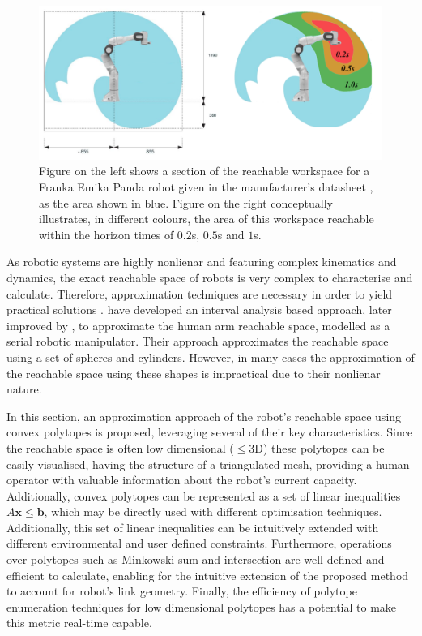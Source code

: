 \begin{figure}
    \centering
    \includegraphics[width=0.8\linewidth]{Papers/images/all_rs_thesis.png}
    \caption{Figure on the left shows a section of the reachable workspace for a Franka Emika Panda robot given in the manufacturer's datasheet \cite{franka_maual}, as the area shown in blue. Figure on the right conceptually illustrates, in different colours, the area of this workspace reachable within the horizon times of $0.2$s, $0.5$s and $1$s.}
    \label{fig:franak_reachable_worksapce}
\end{figure}

As robotic systems are highly nonlienar and featuring complex kinematics and dynamics, the exact reachable space of robots is very complex to characterise and calculate.  Therefore, approximation techniques are necessary in order to yield practical solutions \cite{Althoff2021SetBased}. \citet{pereira2017} have developed an interval analysis based approach, later improved by \citet{schepp2022}, to approximate the human arm reachable space, modelled as a serial robotic manipulator. Their approach approximates the reachable space using a set of spheres and cylinders. However, in many cases the approximation of the reachable space using these shapes is impractical due to their nonlienar nature. 

In this section, an approximation approach of the robot's reachable space using convex polytopes is proposed, leveraging several of their key characteristics. Since the reachable space is often low dimensional ($\leq$3D) these polytopes can be easily visualised, having the structure of a triangulated mesh, providing a human operator with valuable information about the robot's current capacity. Additionally, convex polytopes can be represented as a set of linear inequalities $A\bm{x}\leq\bm{b}$, which may be directly used with different optimisation techniques. Additionally, this set of linear inequalities can be intuitively extended with different environmental and user defined constraints. Furthermore, operations over polytopes such as Minkowski sum and intersection are well defined and efficient to calculate, enabling for the intuitive extension of the proposed method to account for robot's link geometry. Finally, the efficiency of polytope enumeration techniques for low dimensional polytopes has a potential to make this metric real-time capable. 

